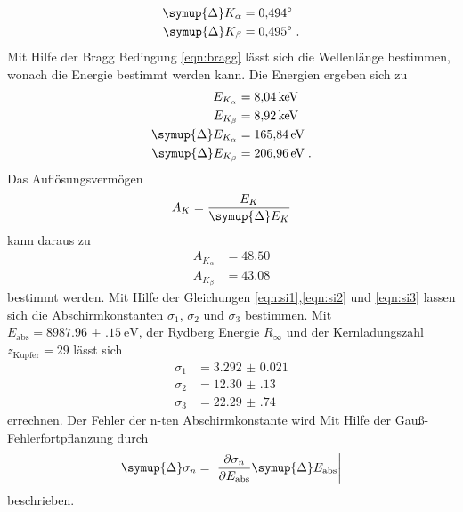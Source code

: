 \begin{align*}
    \symup{\Delta}K_\alpha  &= \ang{0.494;;} \\
    \symup{\Delta}K_\beta   &= \ang{0.495;;} \; \text{.}
\end{align*}
Mit Hilfe der Bragg Bedingung \eqref{eqn:bragg} lässt sich die Wellenlänge bestimmen, wonach die Energie bestimmt werden kann.
Die Energien ergeben sich zu 
\begin{align*}
    E_{K_\alpha} & =  \SI{8.04}{\kilo\electronvolt} \\
    E_{K_\beta}  & =  \SI{8.92}{\kilo\electronvolt} \\
    \symup{\Delta}E_{K_\alpha} &= \SI{165.84}{\electronvolt} \\
    \symup{\Delta}E_{K_\beta}  &= \SI{206.96}{\electronvolt} \; \text{.}
\end{align*}
Das Auflösungsvermögen 
\begin{equation}
    A_K = \frac{E_K}{\symup{\Delta}E_K}
\end{equation}
kann daraus zu 
\begin{align*}
    A_{K_\alpha}&= \num{48.50} \\
    A_{K_\beta} &= \num{43.08}
\end{align*}
bestimmt werden.
Mit Hilfe der Gleichungen \eqref{eqn:si1},\eqref{eqn:si2} und \eqref{eqn:si3} lassen sich die Abschirmkonstanten $\sigma_1$, $\sigma_2$ und $\sigma_3$ bestimmen.
Mit $E_\text{abs} = \SI{8987.96(15)}{\electronvolt}$\cite{eabs}, der Rydberg Energie $R_\infty$ und der Kernladungszahl
$z_\text{Kupfer} = 29 $ lässt sich
\begin{align*}
    \sigma_1 &= \num{3.292(21)}  \\
    \sigma_2 &= \num{12.30(13)}  \\
    \sigma_3 &= \num{22.29(74)}
\end{align*}
errechnen.
Der Fehler der n-ten Abschirmkonstante wird Mit Hilfe der Gauß-Fehlerfortpflanzung durch
\begin{equation}
    \symup{\Delta} \sigma_n = \left | \frac{\partial \sigma_n}{\partial E_\text{abs} } \symup{\Delta} E_\text{abs} \right | 
\end{equation} 
beschrieben.
